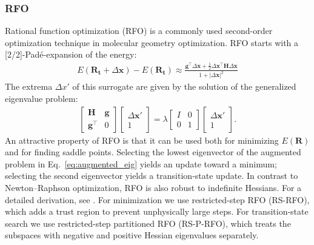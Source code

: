 \documentclass[pdflatex,sn-mathphys-num]{sn-jnl}%
\begin{document}
\subsubsection{RFO \label{sec:rfo_background}}
Rational function optimization (RFO) \citep{simons1983,banerjee1985} is a commonly used second-order optimization technique in molecular geometry optimization. RFO starts with a [2/2]-Pad\'e-expansion of the energy:
\begin{align}
    E(\mathbf{R_t} + \Delta \mathbf{x}) - E(\mathbf{R_t}) \approx \frac{\mathbf{g}^\top \Delta \mathbf{x} + \frac{1}{2} \Delta \mathbf{x}^\top \mathbf{H} \Delta \mathbf{x}}{1 + |\Delta\mathbf{x}|^2 }
\end{align}
The extrema $\Delta x'$ of this surrogate are given by the solution of the generalized eigenvalue problem:
\begin{align}
\begin{bmatrix}
    \mathbf{H} & \mathbf{g} \\
    \mathbf{g}^\top & 0
\end{bmatrix}
\begin{bmatrix}
    \Delta \mathbf{x}' \\
    1
\end{bmatrix}
=
\lambda
\begin{bmatrix}
    I & 0 \\
    0 & 1
\end{bmatrix}
\begin{bmatrix}
    \Delta \mathbf{x}' \\
    1
\end{bmatrix}. \label{eq:augmented_eig}
\end{align}
An attractive property of RFO is that it can be used both for minimizing $E(\mathbf{R})$ and for finding saddle points. Selecting the lowest eigenvector of the augmented problem in Eq.~\eqref{eq:augmented_eig} yields an update toward a minimum; selecting the second eigenvector yields a transition-state update. In contrast to Newton--Raphson optimization, RFO is also robust to indefinite Hessians. For a detailed derivation, see \citep{simons1983, banerjee1985}. For minimization we use restricted-step RFO (RS-RFO), which adds a trust region to prevent unphysically large steps. For transition-state search we use restricted-step partitioned RFO (RS-P-RFO), which treats the subspaces with negative and positive Hessian eigenvalues separately.
\end{document}
